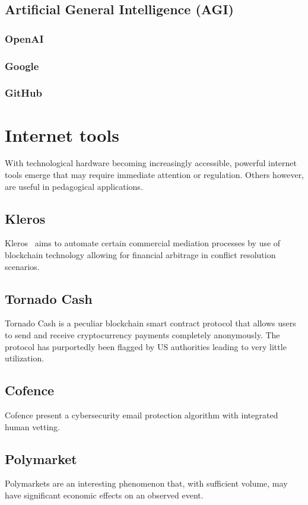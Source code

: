 \documentclass[11pt]{article}
\begin{document}
\subsection{Artificial General Intelligence (AGI)}
\subsubsection{OpenAI}
\subsubsection{Google}
\subsubsection{GitHub}

\section{Internet tools}
With technological hardware becoming increasingly accessible, powerful internet tools emerge that may require immediate attention or regulation. Others however, are useful in pedagogical applications.
\subsection{Kleros~\cite{zhuk_2023_applying}}
Kleros~\cite{zhuk_2023_applying} aims to automate certain commercial mediation processes by use of blockchain technology allowing for financial arbitrage in conflict resolution scenarios.
\subsection{Tornado Cash~\cite{nadler_2023_tornado}~\cite{pertsev_2019_tornado}}
Tornado Cash is a peculiar blockchain smart contract protocol that allows users to send and receive cryptocurrency payments completely anonymously. The protocol has purportedly been flagged by US authorities leading to very little utilization.
\subsection{Cofence~\cite{cofense_2024_phishme}}
Cofence present a cybersecurity email protection algorithm with integrated human vetting.
\subsection{Polymarket~\cite{polymarket}}
Polymarkets are an interesting phenomenon that, with sufficient volume, may have significant economic effects on an observed event.
\end{document}
